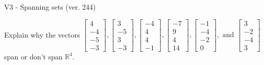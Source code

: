 \begin{exercise}
  \begin{exerciseTitle}V3 - Spanning sets (ver. 244)\end{exerciseTitle}
  \begin{exerciseStatement}
    Explain why the vectors \(\left[\begin{array}{r}
4 \\
-4 \\
-5 \\
-3
\end{array}\right] , \left[\begin{array}{r}
3 \\
-5 \\
3 \\
-3
\end{array}\right] , \left[\begin{array}{r}
-4 \\
4 \\
4 \\
-1
\end{array}\right] , \left[\begin{array}{r}
-7 \\
9 \\
4 \\
14
\end{array}\right] , \left[\begin{array}{r}
-1 \\
-4 \\
-2 \\
0
\end{array}\right] , \text{ and } \left[\begin{array}{r}
3 \\
-2 \\
-4 \\
3
\end{array}\right]\) span or don't span \(\mathbb{R}^4\). 
	



\end{exerciseStatement}
\end{exercise}

